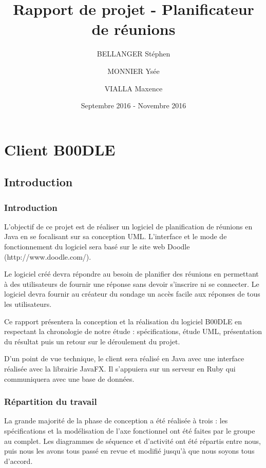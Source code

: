 \documentclass[titlepage]{report}
\title{Rapport de projet - Planificateur de réunions}
\author{BELLANGER Stéphen \and
			MONNIER Ysée \and
			VIALLA Maxence}
\date{Septembre 2016 - Novembre 2016}
\begin{document}
	
\maketitle

\tableofcontents

\listoffigures 

\part{Client B00DLE}

\chapter{Introduction}

\section{Introduction}

\par
L'objectif de ce projet est de réaliser un logiciel de planification de réunions en Java en se focalisant sur sa conception UML. 
L'interface et le mode de fonctionnement du logiciel sera basé sur le site web Doodle (http://www.doodle.com/). 
\par
Le logiciel créé devra répondre au besoin de planifier des réunions en permettant à des utilisateurs de fournir une réponse sans devoir s'inscrire ni se connecter. 
Le logiciel devra fournir au créateur du sondage un accès facile aux réponses de tous les utilisateurs.
\par
Ce rapport présentera la conception et la réalisation du logiciel B00DLE en respectant la chronologie de notre étude : spécifications, étude UML, présentation du résultat puis un retour sur le déroulement du projet.
\par D'un point de vue technique, le client sera réalisé en Java avec une interface réalisée avec la librairie JavaFX. Il s'appuiera sur un serveur en Ruby qui communiquera avec une base de données.

\section{Répartition du travail}

\par La grande majorité de la phase de conception a été réalisée à trois : les spécifications et la modélisation de l'axe fonctionnel ont été faites par le groupe au complet.
Les diagrammes de séquence et d'activité ont été répartis entre nous, puis nous les avons tous passé en revue et modifié jusqu'à que nous soyons tous d'accord.
\end{document}
